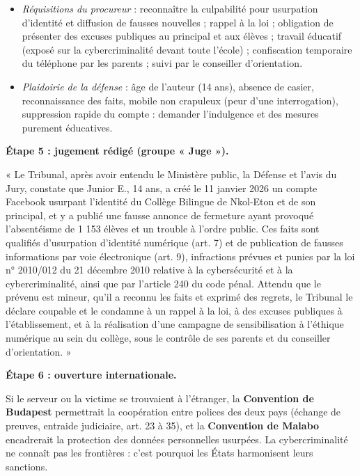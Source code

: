 \documentclass[11pt]{article}
\begin{document}
\begin{exoresolu}
\begin{itemize}
\item \emph{Réquisitions du procureur} : reconnaître la culpabilité pour usurpation d'identité et diffusion de fausses nouvelles ; rappel à la loi ; obligation de présenter des excuses publiques au principal et aux élèves ; travail éducatif (exposé sur la cybercriminalité devant toute l'école) ; confiscation temporaire du téléphone par les parents ; suivi par le conseiller d'orientation.
\item \emph{Plaidoirie de la défense} : âge de l'auteur (14 ans), absence de casier, reconnaissance des faits, mobile non crapuleux (peur d'une interrogation), suppression rapide du compte : demander l'indulgence et des mesures purement éducatives.
\end{itemize}

\textbf{Étape 5 : jugement rédigé (groupe « Juge »).}

« Le Tribunal, après avoir entendu le Ministère public, la Défense et l'avis du Jury, constate que Junior E., 14 ans, a créé le 11 janvier 2026 un compte Facebook usurpant l'identité du Collège Bilingue de Nkol-Eton et de son principal, et y a publié une fausse annonce de fermeture ayant provoqué l'absentéisme de 1 153 élèves et un trouble à l'ordre public. Ces faits sont qualifiés d'usurpation d'identité numérique (art. 7) et de publication de fausses informations par voie électronique (art. 9), infractions prévues et punies par la loi n° 2010/012 du 21 décembre 2010 relative à la cybersécurité et à la cybercriminalité, ainsi que par l'article 240 du code pénal. Attendu que le prévenu est mineur, qu'il a reconnu les faits et exprimé des regrets, le Tribunal le déclare coupable et le condamne à un rappel à la loi, à des excuses publiques à l'établissement, et à la réalisation d'une campagne de sensibilisation à l'éthique numérique au sein du collège, sous le contrôle de ses parents et du conseiller d'orientation. »

\textbf{Étape 6 : ouverture internationale.}

Si le serveur ou la victime se trouvaient à l'étranger, la \textbf{Convention de Budapest} permettrait la coopération entre polices des deux pays (échange de preuves, entraide judiciaire, art. 23 à 35), et la \textbf{Convention de Malabo} encadrerait la protection des données personnelles usurpées. La cybercriminalité ne connaît pas les frontières : c'est pourquoi les États harmonisent leurs sanctions.
\end{exoresolu}
\end{document}
